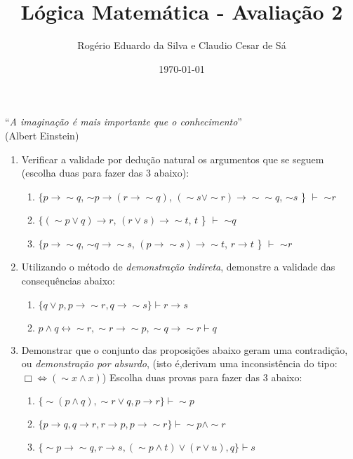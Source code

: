 \documentclass[12pt]{article}
\title{Lógica Matemática - Avaliação 2}
\author{Rogério Eduardo da Silva e Claudio Cesar de Sá}
\date{\today}
\begin{document}
\maketitle

\begin{flushright}
``\textit{A imaginação é mais importante que o conhecimento}''\\ (Albert Einstein)
\end{flushright}

\begin{large}
\begin{enumerate}

\item Verificar a validade por dedução natural os argumentos que se seguem (escolha duas para fazer das 3 abaixo):

\begin{enumerate}
\item $\{ p\rightarrow \sim q$, $\sim p \rightarrow (r \rightarrow \sim q)$, $(\sim s \vee \sim r)\rightarrow \sim \sim q$, $\sim s$ \} {\bf $\vdash $} $\sim r$

\item $\{(\sim p\vee q) \rightarrow r$,  $(r \vee s)\rightarrow \sim t$, $t$ \} {\bf $\vdash $} $\sim q$

\item $\{ p\rightarrow \sim q$,  $\sim q \rightarrow \sim s$,  $(p \rightarrow \sim s) \rightarrow \sim t$,  $r \rightarrow t$ \}  {\bf $\vdash $} $\sim r$
\end{enumerate}


\item Utilizando o método de {\em demonstração indireta}, demonstre a validade das consequências abaixo:
\begin{enumerate}
\item $\{ q \vee p, p \rightarrow \sim r, q \rightarrow \sim s \} \vdash r \rightarrow s $

\item $p \wedge q \leftrightarrow\sim r, \sim r \rightarrow\sim p, \sim q \rightarrow\sim r \vdash q$
\end{enumerate}

\item Demonstrar que o conjunto das proposições abaixo geram uma contradição, ou {\em demonstração por absurdo},  (isto é,derivam uma inconsistência do tipo: $\Box \Leftrightarrow (\sim x \wedge x)$) Escolha duas provas para fazer das 3 abaixo:

\begin{enumerate}
\item $\{ \sim (p \wedge q), \sim r \vee q, p \rightarrow r \} \vdash \sim p $
\item $\{ p \rightarrow q, q \rightarrow r, r \rightarrow p, p \rightarrow \sim r \} \vdash \sim p \wedge \sim r $
\item $\{ \sim p \rightarrow \sim q, r \rightarrow s, (\sim p \wedge t) \vee (r  \vee u), q \} \vdash s $
\end{enumerate}
\end{enumerate}
\end{large}
\end{document}
